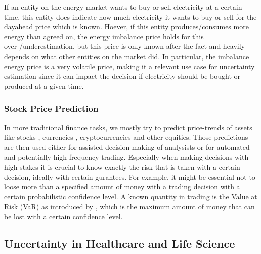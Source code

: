 If an entity on the energy market wants to buy or sell electricity at a certain time, this entity does indicate how much electricity it wants to buy or sell for the dayahead price which is known. Hoever, if this entity produces/consumes more energy than agreed on, the energy imbalance price holds for this over-/underestimation, but this price is only known after the fact and heavily depends on what other entities on the market did. In particular, the imbalance energy price is a very volatile price, making it a relevant use case for uncertainty estimation since it can impact the decision if electricity should be bought or produced at a given time. %

\subsubsection{Stock Price Prediction}
In more traditional finance tasks, we mostly try to predict price-trends of assets like stocks \cite{singh2017stock}, currencies \cite{hassanpour2023evaluation}, cryptocurrencies \cite{alessandretti2018anticipating} and other equities. Those predictions are then used either for assisted decision making of analysists or for automated and potentially high frequency trading. Especially when making decisions with high stakes it is crucial to know exactly the risk that is taken with a certain decision, ideally with certain gurantees. For example, it might be essential not to loose more than a specified amount of money with a trading decision with a certain probabilistic confidence level. A known quantity in trading is the Value at Risk (VaR) as introduced by \cite{jorion2007value}, which is the maximum amount of money that can be lost with a certain confidence level.

\subsection{Uncertainty in Healthcare and Life Science}


